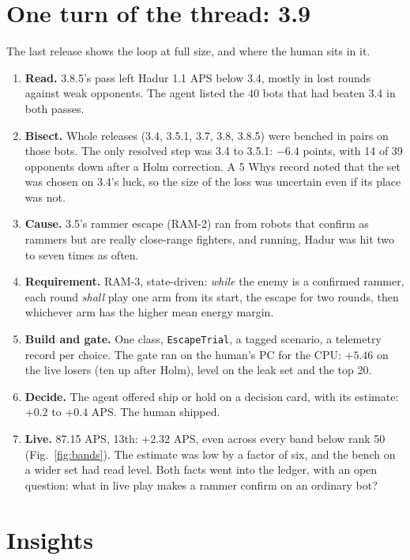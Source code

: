 \documentclass[10pt,twocolumn]{article}
\newcommand{\req}[1]{\textsf{#1}}
\begin{document}
\section{One turn of the thread: 3.9}\label{sec:example}

The last release shows the loop at full size, and where the human sits in it.

\begin{enumerate}[label=\arabic*.]
\item \textbf{Read.} 3.8.5's pass left Hadur 1.1 APS below 3.4, mostly in lost rounds against weak
  opponents. The agent listed the 40 bots that had beaten 3.4 in both passes.
\item \textbf{Bisect.} Whole releases (3.4, 3.5.1, 3.7, 3.8, 3.8.5) were benched in pairs on those
  bots. The only resolved step was 3.4 to 3.5.1: $-6.4$ points, with 14 of 39 opponents down after
  a Holm correction. A 5 Whys record noted that the set was chosen on 3.4's luck, so the size of the
  loss was uncertain even if its place was not.
\item \textbf{Cause.} 3.5's rammer escape (\req{RAM-2}) ran from robots that confirm as rammers but
  are really close-range fighters, and running, Hadur was hit two to seven times as often.
\item \textbf{Requirement.} \req{RAM-3}, state-driven: \emph{while} the enemy is a confirmed rammer,
  each round \emph{shall} play one arm from its start, the escape for two rounds, then whichever arm
  has the higher mean energy margin.
\item \textbf{Build and gate.} One class, \texttt{EscapeTrial}, a tagged scenario, a telemetry
  record per choice. The gate ran on the human's PC for the CPU: $+5.46$ on the live losers (ten up
  after Holm), level on the leak set and the top 20.
\item \textbf{Decide.} The agent offered ship or hold on a decision card, with its estimate:
  $+0.2$ to $+0.4$ APS. The human shipped.
\item \textbf{Live.} 87.15 APS, 13th: $+2.32$ APS, even across every band below rank 50
  (Fig.~\ref{fig:bands}). The estimate was low by a factor of six, and the bench on a wider set had
  read level. Both facts went into the ledger, with an open question: what in live play makes a
  rammer confirm on an ordinary bot?
\end{enumerate}

\section{Insights}\label{sec:insights}
\end{document}
